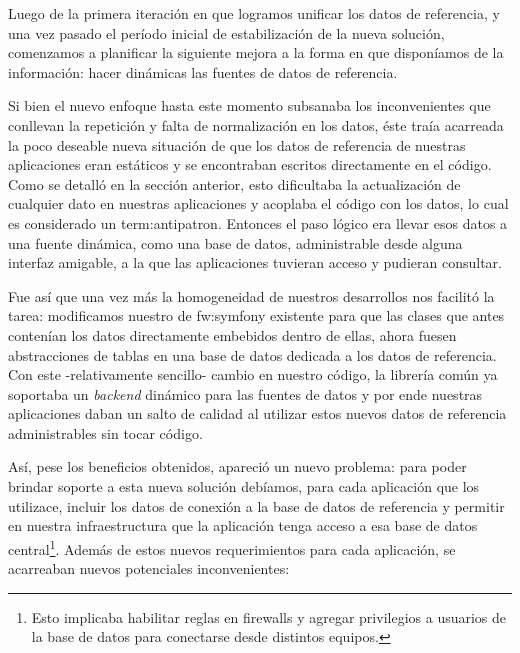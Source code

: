 Luego de la primera iteración en que logramos unificar los datos de referencia, y una vez pasado el período inicial de estabilización de la nueva solución, comenzamos a planificar la siguiente mejora a la forma en que disponíamos de la información: hacer dinámicas las fuentes de datos de referencia.

Si bien el nuevo enfoque hasta este momento subsanaba los inconvenientes que conllevan la repetición y falta de normalización en los datos, éste traía acarreada  la poco deseable nueva situación de que los datos de referencia de nuestras aplicaciones eran estáticos y se encontraban escritos directamente en el código. Como se detalló en la sección anterior, esto dificultaba la actualización de cualquier dato en nuestras aplicaciones y  acoplaba el código con los datos, lo cual es considerado un \gls{term:antipatron}. Entonces el paso lógico era llevar esos datos a una fuente dinámica, como una base de datos, administrable desde alguna interfaz amigable, a la que las aplicaciones tuvieran acceso y pudieran consultar.

Fue así que una vez más la homogeneidad de nuestros desarrollos nos facilitó la tarea: modificamos nuestro  de \gls{fw:symfony} existente para que las clases que antes contenían los datos directamente embebidos dentro de ellas, ahora fuesen abstracciones de tablas en una base de datos dedicada a los datos de referencia. Con este -relativamente sencillo- cambio en nuestro código, la librería común ya soportaba un \textit{backend} dinámico para las fuentes de datos y por ende nuestras aplicaciones daban un salto de calidad al utilizar estos nuevos datos de referencia administrables sin tocar código.

Así, pese los beneficios obtenidos, apareció un nuevo problema: para poder brindar soporte a esta nueva solución debíamos, para cada aplicación que los utilizace, incluir los datos de conexión a la base de datos de referencia y permitir en nuestra infraestructura que la aplicación tenga acceso a esa base de datos central\footnote{Esto implicaba habilitar reglas en firewalls y agregar privilegios a usuarios de la base de datos para conectarse desde distintos equipos.}. Además de estos nuevos requerimientos para cada aplicación, se acarreaban nuevos potenciales inconvenientes:

